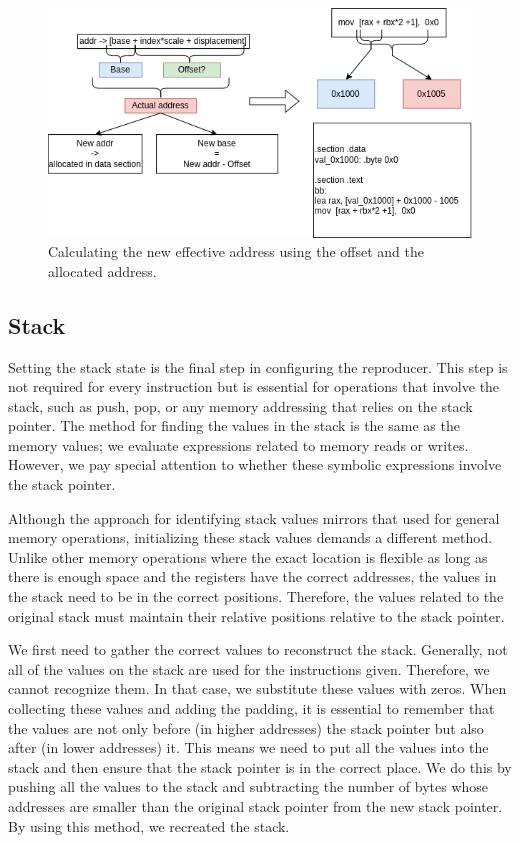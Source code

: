 \begin{figure}[ht]
    \centering
    \includegraphics[width=0.9\linewidth]{figures/mem_addr}
    \caption{Calculating the new effective address using the offset and the allocated address.}
    \label{fig:mem_addr}
\end{figure}

\subsection{Stack}
Setting the stack state is the final step in configuring the reproducer.
This step is not required for every instruction but is essential for operations that involve the stack, such as push, pop, or any memory addressing that relies on the stack pointer.
The method for finding the values in the stack is the same as the memory values; we evaluate expressions related to memory reads or writes.
However, we pay special attention to whether these symbolic expressions involve the stack pointer.

Although the approach for identifying stack values mirrors that used for general memory operations, initializing these stack values demands a different method.
Unlike other memory operations where the exact location is flexible as long as there is enough space and the registers have the correct addresses, the values in the stack need to be in the correct positions.
Therefore, the values related to the original stack must maintain their relative positions relative to the stack pointer.

We first need to gather the correct values to reconstruct the stack.
Generally, not all of the values on the stack are used for the instructions given.
Therefore, we cannot recognize them.
In that case, we substitute these values with zeros.
When collecting these values and adding the padding, it is essential to remember that the values are not only before (in higher addresses) the stack pointer but also after (in lower addresses) it.
This means we need to put all the values into the stack and then ensure that the stack pointer is in the correct place.
We do this by pushing all the values to the stack and subtracting the number of bytes whose addresses are smaller than the original stack pointer from the new stack pointer.
By using this method, we recreated the stack.

